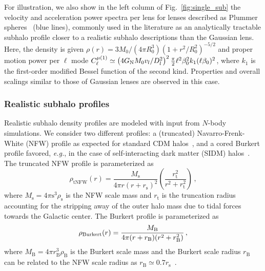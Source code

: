 \documentclass[prd,aps,twocolumn,nofootinbib,superscriptaddress,preprintnumbers,balancelastpage,longbibliography,floatfix]{revtex4-1}
\begin{document}
For illustration, we also show in the left column of Fig.~\ref{fig:single_sub} the velocity and acceleration power spectra per lens for lenses described as Plummer spheres~\cite{Plummer:1911zza} (blue lines), commonly used in the literature as an analytically tractable subhalo profile closer to a realistic subhalo descriptions than the Gaussian lens. Here, the density is given $\rho(r)= 3M_0/(4\pi R_0^3)(1 + r^2/R_0^2)^{-5/2}$ and proper motion power per $\ell$ mode $C_{\ell}^{\mu (1)} \simeq \left({4 G_\mathrm{N} M_0 v_l/D_l^2}\right)^2 \frac{\pi}{2} \ell^2\beta_0^2 k_1(\ell \beta_0)^2$, where $k_1$ is the first-order modified Bessel function of the second kind. Properties and overall scalings similar to those of Gaussian lenses are observed in this case.

\subsubsection{Realistic subhalo profiles}

Realistic subhalo density profiles are modeled with input from $N$-body simulations. We consider two different profiles: a (truncated) Navarro-Frenk-White (NFW) profile as expected for standard CDM halos~\cite{Navarro:1995iw,2008gady.book.....B}, and a cored Burkert profile favored, \emph{e.g.}, in the case of self-interacting dark matter (SIDM) halos~\cite{Burkert:1995yz}. The truncated NFW profile is parameterized as~\cite{Baltz:2007vq}
\begin{equation}
\rho_\text{tNFW}(r)=\frac{M_\mathrm{s}}{4\pi r(r + r_\mathrm{s})^2}\left(\frac{r_\mathrm{t}^2}{r^2 + r_\mathrm{t}^2}\right)\,,
\end{equation}
where $M_\mathrm{s} = 4\pi \mathrm{s}^3\rho_\mathrm{s}$ is the NFW scale mass and $r_\mathrm{t}$ is the truncation radius accounting for the stripping away of the outer halo mass due to tidal forces towards the Galactic center. The Burkert profile is parameterized as
\begin{equation}
\rho_{\rm Burkert}(r) = \frac{M_{\mathrm B}}{4\pi(r+r_{\mathrm B})(r^2 + r_{\mathrm B}^2)}\,,
\end{equation}
where $M_{\mathrm B} = 4\pi r_{\mathrm B}^3\rho_{\mathrm B}$ is the Burkert scale mass and  the Burkert scale radius $r_{\mathrm B}$ can be related to the NFW scale radius as $r_{\mathrm B} \simeq 0.7 r_\mathrm{s}$~\cite{Bartels:2015uba,Lisanti:2017qoz}.
\end{document}
